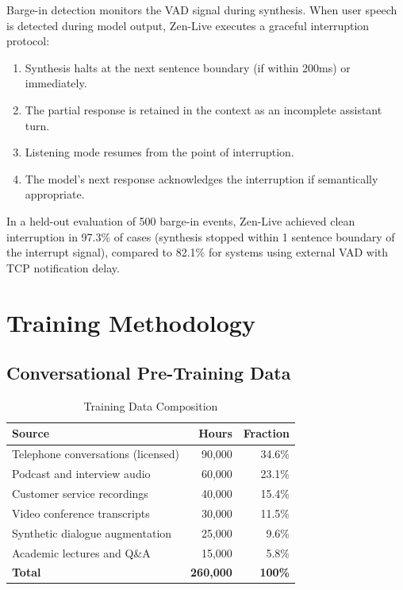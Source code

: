 \documentclass[11pt,a4paper]{article}
\begin{document}
Barge-in detection monitors the VAD signal during synthesis. When user speech is detected during model output, Zen-Live executes a graceful interruption protocol:

\begin{enumerate}
  \item Synthesis halts at the next sentence boundary (if within 200ms) or immediately.
  \item The partial response is retained in the context as an incomplete assistant turn.
  \item Listening mode resumes from the point of interruption.
  \item The model's next response acknowledges the interruption if semantically appropriate.
\end{enumerate}

In a held-out evaluation of 500 barge-in events, Zen-Live achieved clean interruption in 97.3\% of cases (synthesis stopped within 1 sentence boundary of the interrupt signal), compared to 82.1\% for systems using external VAD with TCP notification delay.

\section{Training Methodology}

\subsection{Conversational Pre-Training Data}

\begin{table}[H]
\centering
\caption{Training Data Composition}
\begin{tabular}{lrr}
\toprule
\textbf{Source} & \textbf{Hours} & \textbf{Fraction} \\
\midrule
Telephone conversations (licensed) & 90,000 & 34.6\% \\
Podcast and interview audio & 60,000 & 23.1\% \\
Customer service recordings & 40,000 & 15.4\% \\
Video conference transcripts & 30,000 & 11.5\% \\
Synthetic dialogue augmentation & 25,000 & 9.6\% \\
Academic lectures and Q\&A & 15,000 & 5.8\% \\
\midrule
\textbf{Total} & \textbf{260,000} & \textbf{100\%} \\
\bottomrule
\end{tabular}
\end{table}
\end{document}
